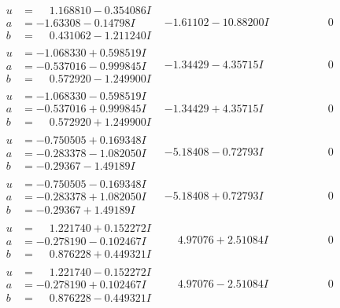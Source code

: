 \documentclass[1p]{elsarticle_modified}
\theoremstyle{definition}
\begin{document}
$$\begin{array}{c|c|c}
\begin{aligned}
u &= \phantom{-}1.168810 - 0.354086 I \\
a &= -1.63308 - 0.14798 I \\
b &= \phantom{-}0.431062 - 1.211240 I\end{aligned}
 & -1.61102 - 10.88200 I & \phantom{-0.000000 } 0 \\ \hline\begin{aligned}
u &= -1.068330 + 0.598519 I \\
a &= -0.537016 - 0.999845 I \\
b &= \phantom{-}0.572920 - 1.249900 I\end{aligned}
 & -1.34429 - 4.35715 I & \phantom{-0.000000 } 0 \\ \hline\begin{aligned}
u &= -1.068330 - 0.598519 I \\
a &= -0.537016 + 0.999845 I \\
b &= \phantom{-}0.572920 + 1.249900 I\end{aligned}
 & -1.34429 + 4.35715 I & \phantom{-0.000000 } 0 \\ \hline\begin{aligned}
u &= -0.750505 + 0.169348 I \\
a &= -0.283378 - 1.082050 I \\
b &= -0.29367 - 1.49189 I\end{aligned}
 & -5.18408 - 0.72793 I & \phantom{-0.000000 } 0 \\ \hline\begin{aligned}
u &= -0.750505 - 0.169348 I \\
a &= -0.283378 + 1.082050 I \\
b &= -0.29367 + 1.49189 I\end{aligned}
 & -5.18408 + 0.72793 I & \phantom{-0.000000 } 0 \\ \hline\begin{aligned}
u &= \phantom{-}1.221740 + 0.152272 I \\
a &= -0.278190 - 0.102467 I \\
b &= \phantom{-}0.876228 + 0.449321 I\end{aligned}
 & \phantom{-}4.97076 + 2.51084 I & \phantom{-0.000000 } 0 \\ \hline\begin{aligned}
u &= \phantom{-}1.221740 - 0.152272 I \\
a &= -0.278190 + 0.102467 I \\
b &= \phantom{-}0.876228 - 0.449321 I\end{aligned}
 & \phantom{-}4.97076 - 2.51084 I & \phantom{-0.000000 } 0 \\ \hline\begin{aligned}

\end{aligned}
\end{array}$$
\end{document}
